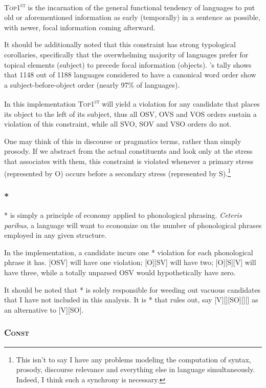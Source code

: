 \documentclass{article}
\newcommand{\cons}{\textsc{Const}}
\newcommand{\topf}{\textsc{Top1\textsuperscript{st}}}
\newcommand{\nophi}{\textsc{*\textphi}}
\begin{document}
{\topf} is the incarnation of the general functional tendency of languages to put old or aforementioned information as early (temporally) in a sentence as possible, with newer, focal information coming afterward.

It should be additionally noted that this constraint has strong typological corollaries, specifically that the overwhelming majority of languages prefer for topical elements (subject) to precede focal information (objects).
\textcite{dryer13}'s tally shows that 1148 out of 1188 languages considered to have a canonical word order show a subject-before-object order (nearly 97\% of languages).

In this implementation {\topf} will yield a violation for any candidate that places its object to the left of its subject, thus all OSV, OVS and VOS orders sustain a violation of this constraint, while all SVO, SOV and VSO orders do not.

One may think of this in discourse or pragmatics terms, rather than simply prosody.
If we abstract from the actual constituents and look only at the stress that associates with them, this constraint is violated whenever a primary stress (represented by O) occurs before a secondary stress (represented by S).\footnote{This isn't to say I have any problems modeling the computation of syntax, prosody, discourse relevance and everything else in language simultaneously. Indeed, I think such a synchrony is necessary.}

\subsubsection{\nophi}

{\nophi} is simply a principle of economy applied to phonological phrasing.
\textit{Ceteris paribus}, a language will want to economize on the number of phonological phrases employed in any given structure.

In the implementation, a candidate incurs one {\nophi} violation for each phonological phrase it has.
[OSV] will have one violation; [O][SV] will have two; [O][S][V] will have three, while a totally unparsed OSV would hypothetically have zero.

It should be noted that {\nophi} is solely responsible for weeding out vacuous candidates that I have not included in this analysis.
It is {\nophi} that rules out, say [V][][SO][][] as an alternative to [V][SO].

\subsubsection{\cons}
\end{document}
